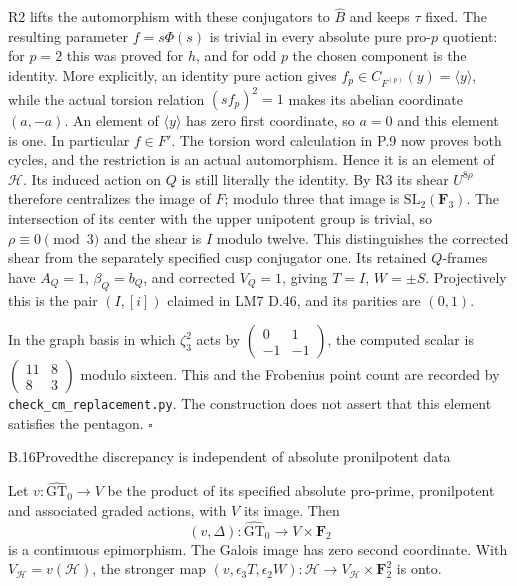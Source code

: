 R2 lifts the automorphism with these conjugators to $\widehat B$
and keeps $\tau$ fixed. The resulting parameter $f=s\Phi(s)$
is trivial in every absolute pure pro-$p$ quotient: for $p=2$
this was proved for $h$, and for odd $p$ the chosen component
is the identity. More explicitly, an identity pure action gives
$f_p\in C_{F^{(p)}}(y)=\langle y\rangle$, while the actual
torsion relation $(sf_p)^2=1$ makes its abelian coordinate
$(a,-a)$. An element of $\langle y\rangle$ has zero first
coordinate, so $a=0$ and this element is one.
In particular $f\in F'$. The torsion word
calculation in P.9 now proves both cycles, and the restriction
is an actual automorphism. Hence it is an element of $\mathcal H$.
Its induced action on $Q$ is still literally the identity.
By R3 its shear $U^{8\rho}$ therefore centralizes the image of
$F$; modulo three that image is $\mathrm{SL}_2(\mathbf F_3)$.
The intersection of its center with the upper unipotent group
is trivial, so $\rho\equiv0\pmod3$ and the shear is $I$
modulo twelve. This distinguishes the corrected shear from the
separately specified cusp conjugator one.
Its retained $Q$-frames have $A_Q=1$, $\beta_Q=b_Q$, and
corrected $V_Q=1$, giving $T=I$, $W=\pm S$. Projectively this is the
pair $(I,[i])$ claimed in LM7 D.46, and its parities are $(0,1)$.

In the graph basis in which $\zeta_3^2$ acts by
$\left(\begin{smallmatrix}0&1\\-1&-1\end{smallmatrix}\right)$,
the computed scalar is
$\left(\begin{smallmatrix}11&8\\8&3\end{smallmatrix}\right)$
modulo sixteen. This and the Frobenius point count are recorded
by \texttt{check\_cm\_replacement.py}. The construction does
not assert that this element satisfies the pentagon.
\hfill$\square$

\begin{statement}{B.16}{Proved}{the discrepancy is independent of absolute pronilpotent data}
\end{statement}
Let $v:\widehat{\mathrm{GT}}_0\to V$ be the product of its
specified absolute pro-prime, pronilpotent and associated graded
actions, with $V$ its image. Then
\[
 (v,\Delta):\widehat{\mathrm{GT}}_0
                  \longrightarrow V\times\mathbf F_2
\]
is a continuous epimorphism. The Galois image has zero second
coordinate. With $V_{\mathcal H}=v(\mathcal H)$, the stronger
map $(v,\epsilon_3T,\epsilon_2W):\mathcal H\to
V_{\mathcal H}\times\mathbf F_2^2$ is onto.

